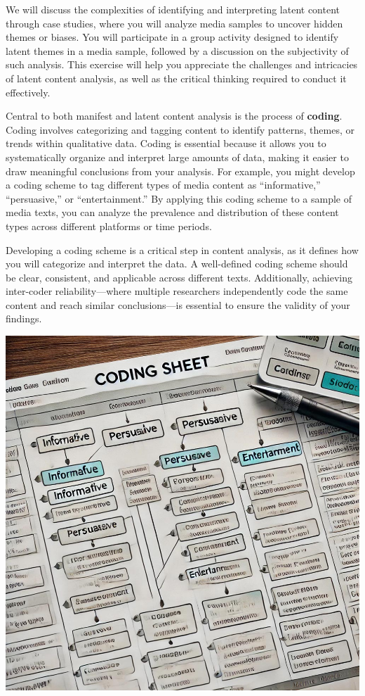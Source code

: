 \documentclass[
]{book}
\begin{document}
We will discuss the complexities of identifying and interpreting latent content through case studies, where you will analyze media samples to uncover hidden themes or biases. You will participate in a group activity designed to identify latent themes in a media sample, followed by a discussion on the subjectivity of such analysis. This exercise will help you appreciate the challenges and intricacies of latent content analysis, as well as the critical thinking required to conduct it effectively.

Central to both manifest and latent content analysis is the process of \textbf{coding}. Coding involves categorizing and tagging content to identify patterns, themes, or trends within qualitative data. Coding is essential because it allows you to systematically organize and interpret large amounts of data, making it easier to draw meaningful conclusions from your analysis. For example, you might develop a coding scheme to tag different types of media content as ``informative,'' ``persuasive,'' or ``entertainment.'' By applying this coding scheme to a sample of media texts, you can analyze the prevalence and distribution of these content types across different platforms or time periods.

Developing a coding scheme is a critical step in content analysis, as it defines how you will categorize and interpret the data. A well-defined coding scheme should be clear, consistent, and applicable across different texts. Additionally, achieving inter-coder reliability---where multiple researchers independently code the same content and reach similar conclusions---is essential to ensure the validity of your findings.

\includegraphics[width=1\textwidth,height=\textheight]{images/fig045.jpg}
\end{document}
